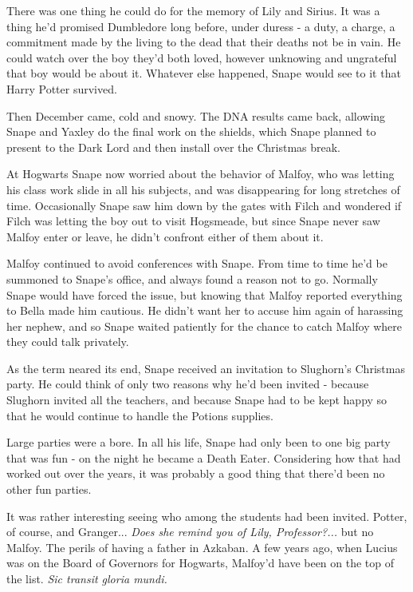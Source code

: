 \documentclass[a4paper,11pt]{article}
\begin{document}
There was one thing he could do for the memory of Lily and Sirius. It was a thing he'd promised Dumbledore long before, under duress - a duty, a charge, a commitment made by the living to the dead that their deaths not be in vain. He could watch over the boy they'd both loved, however unknowing and ungrateful that boy would be about it. Whatever else happened, Snape would see to it that Harry Potter survived.

Then December came, cold and snowy. The DNA results came back, allowing Snape and Yaxley do the final work on the shields, which Snape planned to present to the Dark Lord and then install over the Christmas break.

At Hogwarts Snape now worried about the behavior of Malfoy, who was letting his class work slide in all his subjects, and was disappearing for long stretches of time. Occasionally Snape saw him down by the gates with Filch and wondered if Filch was letting the boy out to visit Hogsmeade, but since Snape never saw Malfoy enter or leave, he didn't confront either of them about it.

Malfoy continued to avoid conferences with Snape. From time to time he'd be summoned to Snape's office, and always found a reason not to go. Normally Snape would have forced the issue, but knowing that Malfoy reported everything to Bella made him cautious. He didn't want her to accuse him again of harassing her nephew, and so Snape waited patiently for the chance to catch Malfoy where they could talk privately.

As the term neared its end, Snape received an invitation to Slughorn's Christmas party. He could think of only two reasons why he'd been invited - because Slughorn invited all the teachers, and because Snape had to be kept happy so that he would continue to handle the Potions supplies.

Large parties were a bore. In all his life, Snape had only been to one big party that was fun - on the night he became a Death Eater. Considering how that had worked out over the years, it was probably a good thing that there'd been no other fun parties.

It was rather interesting seeing who among the students had been invited. Potter, of course, and Granger... \emph{Does she remind you of Lily, Professor?...} but no Malfoy. The perils of having a father in Azkaban. A few years ago, when Lucius was on the Board of Governors for Hogwarts, Malfoy'd have been on the top of the list. \emph{Sic transit gloria mundi.}
\end{document}
